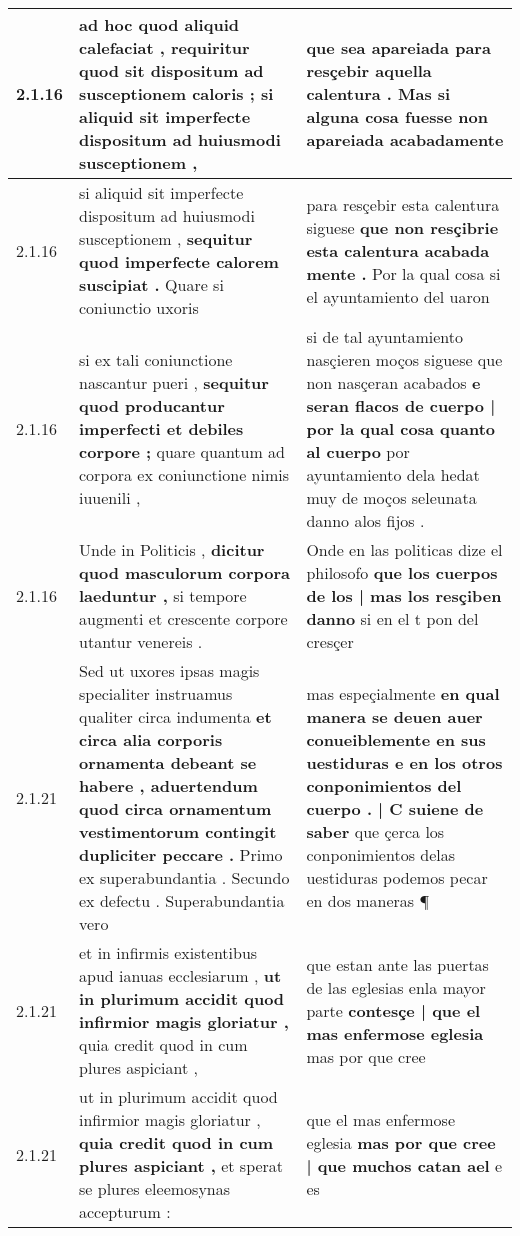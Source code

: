 \begin{tabular}{|p{1cm}|p{6.5cm}|p{6.5cm}|}
2.1.16 & ad hoc quod aliquid calefaciat , \textbf{ requiritur quod sit dispositum ad susceptionem caloris ; } si aliquid sit imperfecte dispositum ad huiusmodi susceptionem , & que sea apareiada \textbf{ para resçebir aquella calentura . } Mas si alguna cosa fuesse non apareiada acabadamente \\\hline
2.1.16 & si aliquid sit imperfecte dispositum ad huiusmodi susceptionem , \textbf{ sequitur quod imperfecte calorem suscipiat . } Quare si coniunctio uxoris & para resçebir esta calentura siguese \textbf{ que non resçibrie esta calentura acabada mente . } Por la qual cosa si el ayuntamiento del uaron \\\hline
2.1.16 & si ex tali coniunctione nascantur pueri , \textbf{ sequitur quod producantur imperfecti et debiles corpore ; } quare quantum ad corpora ex coniunctione nimis iuuenili , & si de tal ayuntamiento nasçieren moços siguese que non nasçeran acabados \textbf{ e seran flacos de cuerpo | por la qual cosa quanto al cuerpo } por ayuntamiento dela hedat muy de moços seleunata danno alos fijos . \\\hline
2.1.16 & Unde in Politicis , \textbf{ dicitur quod masculorum corpora laeduntur , } si tempore augmenti et crescente corpore utantur venereis . & Onde en las politicas dize el philosofo \textbf{ que los cuerpos de los | mas los resçiben danno } si en el t pon del cresçer \\\hline
2.1.21 & Sed ut uxores ipsas magis specialiter instruamus qualiter circa indumenta \textbf{ et circa alia corporis ornamenta debeant se habere , aduertendum quod circa ornamentum vestimentorum contingit dupliciter peccare . } Primo ex superabundantia . Secundo ex defectu . Superabundantia vero & mas espeçialmente \textbf{ en qual manera se deuen auer conueiblemente en sus uestiduras e en los otros conponimientos del cuerpo . | C suiene de saber } que çerca los conponimientos delas uestiduras podemos pecar en dos maneras ¶ \\\hline
2.1.21 & et in infirmis existentibus apud ianuas ecclesiarum , \textbf{ ut in plurimum accidit quod infirmior magis gloriatur , } quia credit quod in cum plures aspiciant , & que estan ante las puertas de las eglesias enla mayor parte \textbf{ contesçe | que el mas enfermose eglesia } mas por que cree \\\hline
2.1.21 & ut in plurimum accidit quod infirmior magis gloriatur , \textbf{ quia credit quod in cum plures aspiciant , } et sperat se plures eleemosynas accepturum : & que el mas enfermose eglesia \textbf{ mas por que cree | que muchos catan ael } e es \\\hline

\end{tabular}
